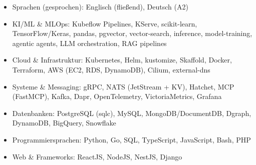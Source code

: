 \documentclass[10pt,a4paper]{resume}
\begin{document}
\begin{itemize}[leftmargin=1.4em,nosep,topsep=2pt]
  \item Sprachen (gesprochen): Englisch (fließend), Deutsch (A2)
  \item KI/ML \& MLOps: Kubeflow Pipelines, KServe, scikit-learn, TensorFlow/Keras, pandas, pgvector, vector-search, inference, model-training, agentic agents, LLM orchestration, RAG pipelines
  \item Cloud \& Infrastruktur: Kubernetes, Helm, kustomize, Skaffold, Docker, Terraform, AWS (EC2, RDS, DynamoDB), Cilium, external-dns
  \item Systeme \& Messaging: gRPC, NATS (JetStream + KV), Hatchet, MCP (FastMCP), Kafka, Dapr, OpenTelemetry, VictoriaMetrics, Grafana
  \item Datenbanken: PostgreSQL (sqlc), MySQL, MongoDB/DocumentDB, Dgraph, DynamoDB, BigQuery, Snowflake
  \item Programmiersprachen: Python, Go, SQL, TypeScript, JavaScript, Bash, PHP
  \item Web \& Frameworks: ReactJS, NodeJS, NestJS, Django
\end{itemize}
\end{document}

